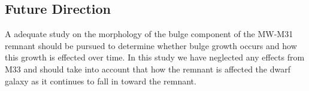 \documentclass[iop]{emulateapj}
\begin{document}
\subsection{Future Direction}
A adequate study on the morphology of the bulge component of the MW-M31 remnant should be pursued to determine whether bulge growth occurs and how this growth is effected over time. In this study we have neglected any effects from M33 and should take into account that how the remnant is affected the dwarf galaxy as it continues to fall in toward the remnant.








\clearpage

\end{document}
